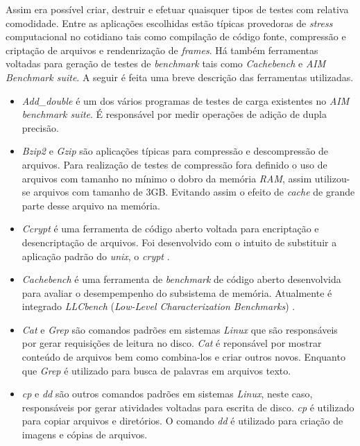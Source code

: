 Assim era possível criar, destruir e efetuar quaisquer tipos de testes com relativa comodidade. Entre as aplicações escolhidas estão típicas provedoras de \textit{stress} computacional no cotidiano tais como compilação de código fonte, compressão e criptação de arquivos e rendenrização de \textit{frames}. Há também ferramentas voltadas para geração de testes de \textit{benchmark} tais como \textit{Cachebench} e \textit{AIM Benchmark suite}. A seguir é feita uma breve descrição das ferramentas utilizadas.

\begin{itemize}
\item \textit{Add\_double} é um dos vários programas de testes de carga existentes no \textit{AIM benchmark suite}. É responsável por medir operações de adição de dupla precisão.

\item \textit{Bzip2} e \textit{Gzip} são aplicações típicas para compressão e descompressão de arquivos. Para realização de testes de compressão fora definido o uso de arquivos com tamanho no mínimo o dobro da memória \textit{RAM}, assim utilizou-se arquivos com tamanho de 3GB. Evitando assim o efeito de \textit{cache} de grande parte desse arquivo na memória.

\item \textit{Ccrypt} é uma ferramenta de código aberto voltada para encriptação e desencriptação de arquivos. Foi desenvolvido com o intuito de substituir a aplicação padrão do \textit{unix}, o \textit{crypt} \cite{ccrypt}.

\item \textit{Cachebench} é uma ferramenta de \textit{benchmark} de código aberto desenvolvida para avaliar o desempempenho do subsistema de memória. Atualmente é integrado \textit{LLCbench} (\textit{Low-Level Characterization Benchmarks}) \cite{cachebench}.

\item \textit{Cat} e \textit{Grep} são comandos padrões em sistemas \textit{Linux} que são responsáveis por gerar requisições de leitura no disco. \textit{Cat} é reponsável por mostrar conteúdo de arquivos bem como combina-los e criar outros novos. Enquanto que \textit{Grep} é utilizado para busca de palavras em arquivos texto.

\item \textit{cp} e \textit{dd} são outros comandos padrões em sistemas \textit{Linux}, neste caso, responsáveis por gerar atividades voltadas para escrita de disco. \textit{cp} é utilizado para copiar arquivos e diretórios. O comando \textit{dd} é utilizado para criação de imagens e cópias de arquivos.


\end{itemize}
